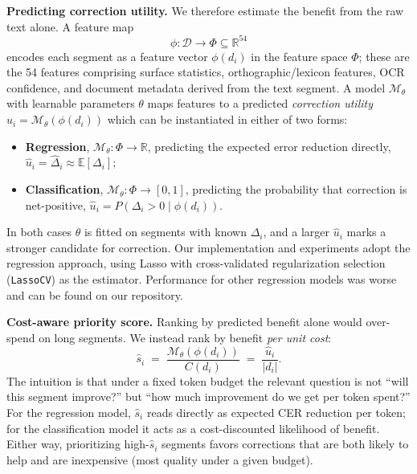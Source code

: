 \documentclass[sigconf]{acmart}
\begin{document}
\medskip\noindent\textbf{Predicting correction utility.}
We therefore estimate the benefit from the raw text alone. A feature map
\[
    \phi: \mathcal{D} \to \Phi \subseteq \mathbb{R}^{54}
\]
encodes each segment as a feature vector $\phi(d_i)$ in the feature space
$\Phi$; these are the 54 features comprising surface statistics, orthographic/lexicon features, OCR confidence, and document metadata derived from the text segment. A model $\mathcal{M}_\theta$ with learnable parameters
$\theta$ maps features to a predicted \emph{correction utility}
$\hat{u}_i = \mathcal{M}_\theta(\phi(d_i))$ which can be instantiated in either of two forms:
\begin{itemize}
    \item \textbf{Regression}, $\mathcal{M}_\theta: \Phi \to \mathbb{R}$,
    predicting the expected error reduction directly,
    $\hat{u}_i = \hat{\Delta}_i \approx \mathbb{E}[\Delta_i]$;
    \item \textbf{Classification}, $\mathcal{M}_\theta: \Phi \to [0,1]$,
    predicting the probability that correction is net-positive,
    $\hat{u}_i = P\!\left(\Delta_i > 0 \mid \phi(d_i)\right)$.
\end{itemize}
In both cases $\theta$ is fitted on segments with known $\Delta_i$, and a larger
$\hat{u}_i$ marks a stronger candidate for correction. Our implementation and experiments adopt the regression approach, using Lasso with cross-validated regularization selection (\texttt{LassoCV}) as the estimator. Performance for other regression models was worse and can be found on our repository.

\medskip\noindent\textbf{Cost-aware priority score.}
Ranking by predicted benefit alone would over-spend on long segments. We instead
rank by benefit \emph{per unit cost}:
\begin{equation}
    \hat{s}_i \;=\; \frac{\mathcal{M}_\theta(\phi(d_i))}{C(d_i)} \;=\; \frac{\hat{u}_i}{|d_i|}.
\end{equation}
The intuition is that under a fixed token budget the relevant question is not
``will this segment improve?'' but ``how much improvement do we get per token
spent?'' For the regression model, $\hat{s}_i$ reads directly as expected CER
reduction per token; for the classification model it acts as a cost-discounted
likelihood of benefit. Either way, prioritizing high-$\hat{s}_i$ segments favors
corrections that are both likely to help and are inexpensive (most quality under a given budget).
\end{document}
